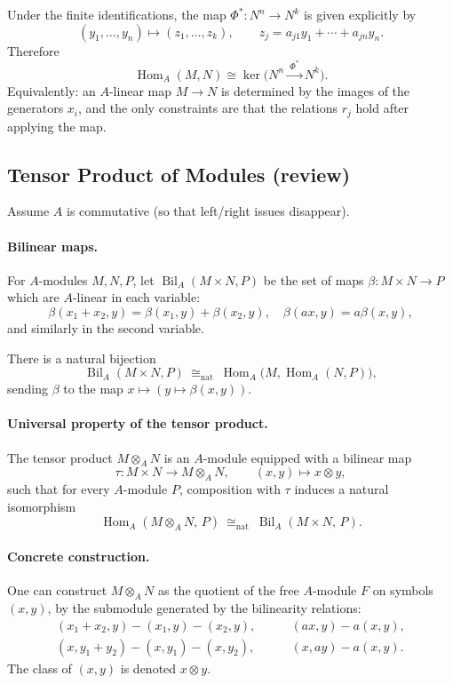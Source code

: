 \documentclass[11pt,a4paper]{article}
\theoremstyle{definition}
\theoremstyle{plain}
\theoremstyle{remark}
\newcommand{\Bil}{\operatorname{Bil}}
\newcommand{\Hom}{\operatorname{Hom}}
\begin{document}
Under the finite identifications, the map $\Phi^*:N^n\to N^k$ is given explicitly by
\[
(y_1,\dots,y_n)\longmapsto (z_1,\dots,z_k),
\qquad
z_j=a_{j1}y_1+\cdots+a_{jn}y_n.
\]
Therefore
\[
\Hom_A(M,N)\cong \ker\!\big(N^n \xrightarrow{\ \Phi^*\ } N^k\big).
\]
Equivalently: an $A$-linear map $M\to N$ is determined by the images of the generators $x_i$, and the only constraints are that the relations $r_j$ hold after applying the map.


\subsection{Tensor Product of Modules (review)}

Assume $A$ is commutative (so that left/right issues disappear).

\paragraph{Bilinear maps.}
For $A$-modules $M,N,P$, let $\Bil_A(M\times N,P)$ be the set of maps
$\beta:M\times N\to P$ which are $A$-linear in each variable:
\[
\beta(x_1+x_2,y)=\beta(x_1,y)+\beta(x_2,y),\quad
\beta(ax,y)=a\beta(x,y),
\]
and similarly in the second variable.

There is a natural bijection
\[
\Bil_A(M\times N,P)\ \cong_{\mathrm{nat}}\ \Hom_A\big(M,\Hom_A(N,P)\big),
\]
sending $\beta$ to the map $x\mapsto (y\mapsto \beta(x,y))$.

\paragraph{Universal property of the tensor product.}
The tensor product $M\otimes_A N$ is an $A$-module equipped with a bilinear map
\[
\tau:M\times N\to M\otimes_A N,\qquad (x,y)\mapsto x\otimes y,
\]
such that for every $A$-module $P$, composition with $\tau$ induces a natural isomorphism
\[
\Hom_A(M\otimes_A N,\,P)\ \cong_{\mathrm{nat}}\ \Bil_A(M\times N,\,P).
\]

\paragraph{Concrete construction.}
One can construct $M\otimes_A N$ as the quotient of the free $A$-module
$F$ on symbols $(x,y)$, by the submodule generated by the bilinearity relations:
\begin{align*}
(x_1+x_2,y)-(x_1,y)-(x_2,y),\qquad &(ax,y)-a(x,y),\\
(x,y_1+y_2)-(x,y_1)-(x,y_2),\qquad &(x,ay)-a(x,y).
\end{align*}
The class of $(x,y)$ is denoted $x\otimes y$.
\end{document}
